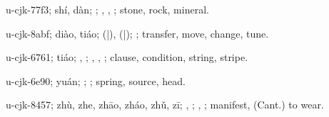\begin{multicols}{2}
{\cjkgGlue{}u-cjk-77f3; shí, dàn; \cjkgGlue{}; \cjkgGlue{}, \cjkgGlue{}, \cjkgGlue{}; stone, rock, mineral.

\cjkgGlue{}u-cjk-8abf; diào, tiáo; \cjkgGlue{}\cjkgGlue{}(\cjkgGlue{}|\cjkgGlue{}), \cjkgGlue{}\cjkgGlue{}(\cjkgGlue{}|\cjkgGlue{}); \cjkgGlue{}; transfer, move, change, tune.

\cjkgGlue{}u-cjk-6761; tiáo; \cjkgGlue{}, \cjkgGlue{}; \cjkgGlue{}, \cjkgGlue{}, \cjkgGlue{}; clause, condition, string, stripe.

\cjkgGlue{}u-cjk-6e90; yuán; \cjkgGlue{}; \cjkgGlue{}; spring, source, head.

\cjkgGlue{}u-cjk-8457; zhù, zhe, zhāo, zháo, zhǔ, zī; \cjkgGlue{}\cjkgGlue{}\cjkgGlue{}, \cjkgGlue{}\cjkgGlue{}\cjkgGlue{}; \cjkgGlue{}, \cjkgGlue{}; manifest, (Cant.) to wear.

}
\end{multicols}
